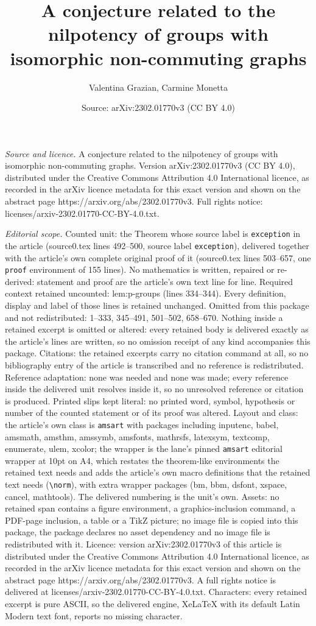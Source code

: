\documentclass[10pt,a4paper]{amsart}
\title[A conjecture related to the nilpotency of groups with isomor]{A conjecture related to the nilpotency of groups with isomorphic non-commuting graphs}
\author{Valentina Grazian, Carmine Monetta}
\date{Source: arXiv:2302.01770v3 (CC BY 4.0)}
\begin{document}
\maketitle

\noindent\emph{Source and licence.} A conjecture related to the nilpotency of groups with isomorphic non-commuting graphs. Version arXiv:2302.01770v3 (CC BY 4.0), distributed under the Creative Commons Attribution 4.0 International licence, as recorded in the arXiv licence metadata for this exact version and shown on the abstract page https://arxiv.org/abs/2302.01770v3. Full rights notice: licenses/arxiv-2302.01770-CC-BY-4.0.txt.\par\smallskip

\noindent\textit{Editorial scope.} Counted unit: the Theorem whose source label is \texttt{exception} in the article (source0.tex lines 492--500, source label \texttt{exception}), delivered together with the article's own complete original proof of it (source0.tex lines 503--657, one \texttt{proof} environment of 155 lines). No mathematics is written, repaired or re-derived: statement and proof are the article's own text line for line. Required context retained uncounted: lem:p-groups (lines 334--344). Every definition, display and label of those lines is retained unchanged. Omitted from this package and not redistributed: 1--333, 345--491, 501--502, 658--670. Nothing inside a retained excerpt is omitted or altered: every retained body is delivered exactly as the article's lines are written, so no omission receipt of any kind accompanies this package. Citations: the retained excerpts carry no citation command at all, so no bibliography entry of the article is transcribed and no reference is redistributed. Reference adaptation: none was needed and none was made; every reference inside the delivered unit resolves inside it, so no unresolved reference or citation is produced. Printed slips kept literal: no printed word, symbol, hypothesis or number of the counted statement or of its proof was altered. Layout and class: the article's own class is \texttt{amsart} with packages including inputenc, babel, amsmath, amsthm, amssymb, amsfonts, mathrsfs, latexsym, textcomp, enumerate, ulem, xcolor; the wrapper is the lane's pinned \texttt{amsart} editorial wrapper at 10pt on A4, which restates the theorem-like environments the retained text needs and adds the article's own macro definitions that the retained text needs (\texttt{\textbackslash norm}), with extra wrapper packages (bm, bbm, dsfont, xspace, cancel, mathtools). The delivered numbering is the unit's own. Assets: no retained span contains a figure environment, a graphics-inclusion command, a PDF-page inclusion, a table or a TikZ picture; no image file is copied into this package, the package declares no asset dependency and no image file is redistributed with it. Licence: version arXiv:2302.01770v3 of this article is distributed under the Creative Commons Attribution 4.0 International licence, as recorded in the arXiv licence metadata for this exact version and shown on the abstract page https://arxiv.org/abs/2302.01770v3. A full rights notice is delivered at licenses/arxiv-2302.01770-CC-BY-4.0.txt. Characters: every retained excerpt is pure ASCII, so the delivered engine, XeLaTeX with its default Latin Modern text font, reports no missing character.
\end{document}

